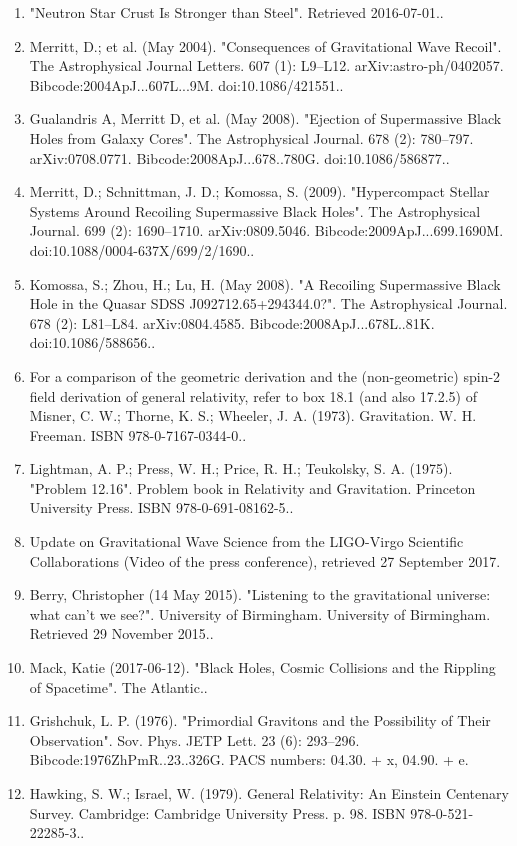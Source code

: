 \begin{enumerate}
\item "Neutron Star Crust Is Stronger than Steel". Retrieved 2016-07-01..
\item Merritt, D.; et al. (May 2004). "Consequences of Gravitational Wave Recoil". The Astrophysical Journal Letters. 607 (1): L9–L12. arXiv:astro-ph/0402057. Bibcode:2004ApJ...607L...9M. doi:10.1086/421551..
\item Gualandris A, Merritt D, et al. (May 2008). "Ejection of Supermassive Black Holes from Galaxy Cores". The Astrophysical Journal. 678 (2): 780–797. arXiv:0708.0771. Bibcode:2008ApJ...678..780G. doi:10.1086/586877..
\item Merritt, D.; Schnittman, J. D.; Komossa, S. (2009). "Hypercompact Stellar Systems Around Recoiling Supermassive Black Holes". The Astrophysical Journal. 699 (2): 1690–1710. arXiv:0809.5046. Bibcode:2009ApJ...699.1690M. doi:10.1088/0004-637X/699/2/1690..
\item Komossa, S.; Zhou, H.; Lu, H. (May 2008). "A Recoiling Supermassive Black Hole in the Quasar SDSS J092712.65+294344.0?". The Astrophysical Journal. 678 (2): L81–L84. arXiv:0804.4585. Bibcode:2008ApJ...678L..81K. doi:10.1086/588656..
\item For a comparison of the geometric derivation and the (non-geometric) spin-2 field derivation of general relativity, refer to box 18.1 (and also 17.2.5) of Misner, C. W.; Thorne, K. S.; Wheeler, J. A. (1973). Gravitation. W. H. Freeman. ISBN 978-0-7167-0344-0..
\item Lightman, A. P.; Press, W. H.; Price, R. H.; Teukolsky, S. A. (1975). "Problem 12.16". Problem book in Relativity and Gravitation. Princeton University Press. ISBN 978-0-691-08162-5..
\item Update on Gravitational Wave Science from the LIGO-Virgo Scientific Collaborations (Video of the press conference), retrieved 27 September 2017.
\item Berry, Christopher (14 May 2015). "Listening to the gravitational universe: what can't we see?". University of Birmingham. University of Birmingham. Retrieved 29 November 2015..
\item Mack, Katie (2017-06-12). "Black Holes, Cosmic Collisions and the Rippling of Spacetime". The Atlantic..
\item Grishchuk, L. P. (1976). "Primordial Gravitons and the Possibility of Their Observation". Sov. Phys. JETP Lett. 23 (6): 293–296. Bibcode:1976ZhPmR..23..326G. PACS numbers: 04.30. + x, 04.90. + e.
\item Hawking, S. W.; Israel, W. (1979). General Relativity: An Einstein Centenary Survey. Cambridge: Cambridge University Press. p. 98. ISBN 978-0-521-22285-3..

\end{enumerate}
